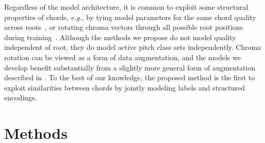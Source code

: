 \documentclass{article}
\def\eg{\emph{e.g.}}
\begin{document}
Regardless of the model architecture, it is common to exploit some structural properties of chords, \eg, by tying model parameters for the same chord quality across roots~\cite{humphrey2015four}, or rotating chroma vectors through all possible root positions during training~\cite{cho2014improved}.
Although the methods we propose do not model quality independent of root, they do model active pitch class sets independently.
Chroma rotation can be viewed as a form of data augmentation, and the models we develop benefit substantially from a slightly more general form of augmentation described in .
To the best of our knowledge, the proposed method is the first to exploit similarities between chords by jointly modeling labels and structured encodings.











\section{Methods}
\label{sec:methods}



\end{document}
